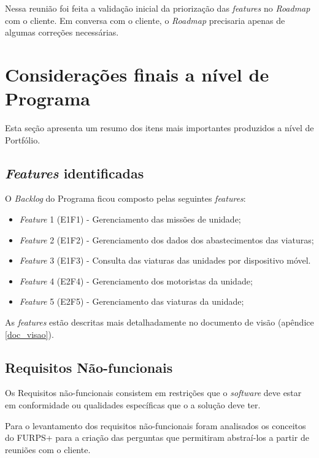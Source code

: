 	Nessa reunião foi feita a validação inicial da priorização das \textit{features} no \textit{Roadmap} com o cliente. 
	Em conversa com o cliente, o \textit{Roadmap} precisaria apenas de algumas correções necessárias.
	
  
  \section{Considerações finais a nível de Programa}
    
    Esta seção apresenta um resumo dos itens mais importantes produzidos a nível de Portfólio.
    
    \subsection{\textit{Features} identificadas}
      
      O \textit{Backlog} do Programa ficou composto pelas seguintes \textit{features}:
      
      \begin{itemize}
       \item \textit{Feature} 1 (E1F1) - Gerenciamento das missões de unidade;
       \item \textit{Feature} 2 (E1F2) - Gerenciamento dos dados dos abastecimentos das viaturas;
       \item \textit{Feature} 3 (E1F3) - Consulta das viaturas das unidades por dispositivo móvel. 
       \item \textit{Feature} 4 (E2F4) - Gerenciamento dos motoristas da unidade;
       \item \textit{Feature} 5 (E2F5) - Gerenciamento das viaturas da unidade;
      \end{itemize}
      
      As \textit{features} estão descritas mais detalhadamente no documento de visão (apêndice \ref{doc_visao}).
              
    \subsection{Requisitos Não-funcionais}
    
          Os Requisitos não-funcionais consistem em restrições que o \textit{software} deve estar em conformidade ou qualidades específicas
          que o a solução deve ter. \cite{leffingwell14}
      
	  Para o levantamento dos requisitos não-funcionais foram analisados os conceitos do FURPS+ para a criação das perguntas que permitiram abstraí-los 
	  a partir de reuniões com o cliente.
	  
